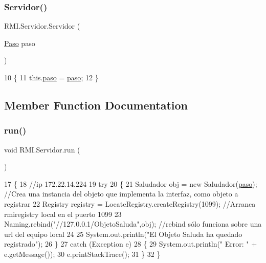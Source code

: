 \subsubsection{\texorpdfstring{Servidor()}{Servidor()}}
{\footnotesize\ttfamily R\+M\+I.\+Servidor.\+Servidor (\begin{DoxyParamCaption}\item[{\mbox{\hyperlink{class_r_m_i_1_1_paso}{Paso}}}]{paso }\end{DoxyParamCaption})\hspace{0.3cm}{\ttfamily [inline]}}


\begin{DoxyCode}
10     \{
11         this.\mbox{\hyperlink{class_r_m_i_1_1_servidor_a1238b87a5a8e06c6e59a187b3bb573ee}{paso}} = \mbox{\hyperlink{class_r_m_i_1_1_servidor_a1238b87a5a8e06c6e59a187b3bb573ee}{paso}};
12     \}
\end{DoxyCode}


\subsection{Member Function Documentation}
\mbox{\label{class_r_m_i_1_1_servidor_afd5edbb2a15b3340e981a9e0833484f9}} 
\subsubsection{\texorpdfstring{run()}{run()}}
{\footnotesize\ttfamily void R\+M\+I.\+Servidor.\+run (\begin{DoxyParamCaption}{ }\end{DoxyParamCaption})\hspace{0.3cm}{\ttfamily [inline]}}


\begin{DoxyCode}
17     \{
18         \textcolor{comment}{//ip 172.22.14.224}
19         \textcolor{keywordflow}{try}
20         \{
21             Saludador obj = \textcolor{keyword}{new} Saludador(\mbox{\hyperlink{class_r_m_i_1_1_servidor_a1238b87a5a8e06c6e59a187b3bb573ee}{paso}}); \textcolor{comment}{//Crea una instancia del objeto que implementa la
       interfaz, como objeto a registrar }
22             Registry registry = LocateRegistry.createRegistry(1099); \textcolor{comment}{//Arranca rmiregistry local en el
       puerto 1099}
23             Naming.rebind(\textcolor{stringliteral}{"//127.0.0.1/ObjetoSaluda"},obj);   \textcolor{comment}{//rebind sólo funciona sobre una url del
       equipo local }
24             
25             System.out.println(\textcolor{stringliteral}{"El Objeto Saluda ha quedado registrado"});
26         \}
27         \textcolor{keywordflow}{catch} (Exception e)
28         \{
29             System.out.println(\textcolor{stringliteral}{" Error: "} + e.getMessage());
30             e.printStackTrace();
31         \}
32     \}
\end{DoxyCode}


